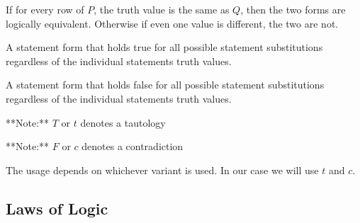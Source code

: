 \documentclass[11pt]{article}
\begin{document}
If for every row of $P$, the truth value is the same as $Q$, then 
the two forms are logically equivalent. Otherwise if even one
value is different, the two are not.

\begin{definition}[Tautology]\label{def:tautology}
A statement form that holds true for all possible statement substitutions regardless of the individual statements truth values.
\end{definition}

\begin{definition}[Contradiction]\label{def:contradiction}
A statement form that holds false for all possible statement substitutions regardless of the individual statements truth values.
\end{definition}

\starON
**Note:** $T$ or $t$ denotes a tautology

**Note:** $F$ or $c$ denotes a contradiction

The usage depends on whichever variant is used. In our case we will use
$t$ and $c$.
\starOFF

\subsection{Laws of Logic}
\end{document}
